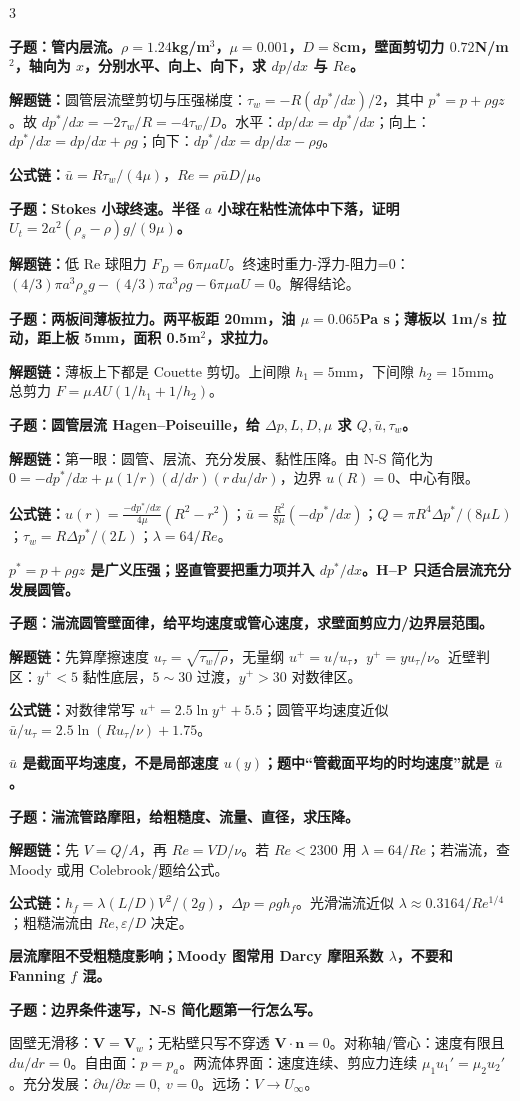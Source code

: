 \documentclass[a4paper]{article}
\newcommand{\qt}[1]{\vspace{1pt}\colorbox{Q}{\parbox{\dimexpr\linewidth-2\fboxsep}{\color{white}\bfseries #1}}\par}
\newcommand{\ans}[1]{\colorbox{G}{\parbox{\dimexpr\linewidth-2\fboxsep}{#1}}\par}
\newcommand{\warn}[1]{\colorbox{Y}{\parbox{\dimexpr\linewidth-2\fboxsep}{\color{E}\bfseries #1}}\par}
\newcommand{\chain}[1]{{\color{A}\bfseries 解题链：}#1\par}
\newcommand{\form}[1]{{\color{M}\bfseries 公式链：}#1\par}
\begin{document}
\begin{multicols}{3}
\qt{子题：管内层流。$\rho=1.24$kg/m$^3$，$\mu=0.001$，$D=8$cm，壁面剪切力 $0.72$N/m$^2$，轴向为 $x$，分别水平、向上、向下，求 $dp/dx$ 与 $Re$。}
\chain{圆管层流壁剪切与压强梯度：$\tau_w=-R(dp^*/dx)/2$，其中 $p^*=p+\rho gz$。故 $dp^*/dx=-2\tau_w/R=-4\tau_w/D$。水平：$dp/dx=dp^*/dx$；向上：$dp^*/dx=dp/dx+\rho g$；向下：$dp^*/dx=dp/dx-\rho g$。}
\form{$\bar u=R\tau_w/(4\mu)$，$Re=\rho\bar uD/\mu$。}

\qt{子题：Stokes 小球终速。半径 $a$ 小球在粘性流体中下落，证明 $U_t=2a^2(\rho_s-\rho)g/(9\mu)$。}
\chain{低 Re 球阻力 $F_D=6\pi\mu aU$。终速时重力-浮力-阻力=0：$(4/3)\pi a^3\rho_sg-(4/3)\pi a^3\rho g-6\pi\mu aU=0$。解得结论。}

\qt{子题：两板间薄板拉力。两平板距 20mm，油 $\mu=0.065$Pa s；薄板以 1m/s 拉动，距上板 5mm，面积 0.5m$^2$，求拉力。}
\chain{薄板上下都是 Couette 剪切。上间隙 $h_1=5$mm，下间隙 $h_2=15$mm。总剪力 $F=\mu AU(1/h_1+1/h_2)$。}

\qt{子题：圆管层流 Hagen--Poiseuille，给 $\Delta p,L,D,\mu$ 求 $Q,\bar u,\tau_w$。}
\chain{第一眼：圆管、层流、充分发展、黏性压降。由 N-S 简化为 $0=-dp^*/dx+\mu(1/r)(d/dr)(r\,du/dr)$，边界 $u(R)=0$、中心有限。}
\form{$u(r)=\frac{-dp^*/dx}{4\mu}(R^2-r^2)$；$\bar u=\frac{R^2}{8\mu}(-dp^*/dx)$；$Q=\pi R^4\Delta p^*/(8\mu L)$；$\tau_w=R\Delta p^*/(2L)$；$\lambda=64/Re$。}
\warn{$p^*=p+\rho gz$ 是广义压强；竖直管要把重力项并入 $dp^*/dx$。H--P 只适合层流充分发展圆管。}

\qt{子题：湍流圆管壁面律，给平均速度或管心速度，求壁面剪应力/边界层范围。}
\chain{先算摩擦速度 $u_\tau=\sqrt{\tau_w/\rho}$，无量纲 $u^+=u/u_\tau$，$y^+=yu_\tau/\nu$。近壁判区：$y^+<5$ 黏性底层，$5\sim30$ 过渡，$y^+>30$ 对数律区。}
\form{对数律常写 $u^+=2.5\ln y^+ +5.5$；圆管平均速度近似 $\bar u/u_\tau=2.5\ln(Ru_\tau/\nu)+1.75$。}
\warn{$\bar u$ 是截面平均速度，不是局部速度 $u(y)$；题中“管截面平均的时均速度”就是 $\bar u$。}

\qt{子题：湍流管路摩阻，给粗糙度、流量、直径，求压降。}
\chain{先 $V=Q/A$，再 $Re=VD/\nu$。若 $Re<2300$ 用 $\lambda=64/Re$；若湍流，查 Moody 或用 Colebrook/题给公式。}
\form{$h_f=\lambda(L/D)V^2/(2g)$，$\Delta p=\rho gh_f$。光滑湍流近似 $\lambda\approx0.3164/Re^{1/4}$；粗糙湍流由 $Re,\varepsilon/D$ 决定。}
\warn{层流摩阻不受粗糙度影响；Moody 图常用 Darcy 摩阻系数 $\lambda$，不要和 Fanning $f$ 混。}

\qt{子题：边界条件速写，N-S 简化题第一行怎么写。}
\ans{固壁无滑移：$\bm V=\bm V_w$；无粘壁只写不穿透 $\bm V\cdot\bm n=0$。对称轴/管心：速度有限且 $du/dr=0$。自由面：$p=p_a$。两流体界面：速度连续、剪应力连续 $\mu_1u_1'=\mu_2u_2'$。充分发展：$\partial u/\partial x=0,\ v=0$。远场：$V\to U_\infty$。}


\end{multicols}
\end{document}
